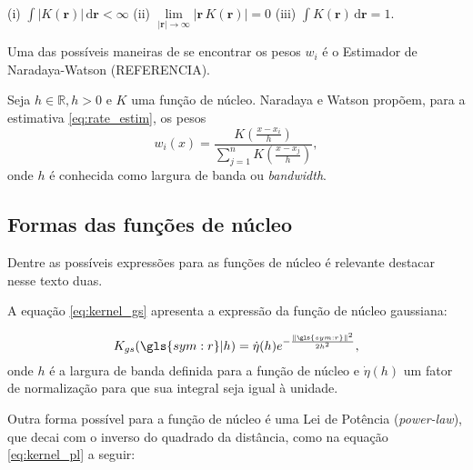 \begin{center}
(i) $\int \lvert K(\boldsymbol{r})\rvert \,\mathrm{d}\boldsymbol{r} < \infty $
\;\;\;\;\;(ii) $\underset{ \lvert\boldsymbol{r} \rvert \to \infty }{\lim} 
				\lvert \boldsymbol{r} \, K(\boldsymbol{r})\rvert =0$ 
\;\;\;\;\;(iii) $\int \! K(\boldsymbol{r})	\,\mathrm{d}\boldsymbol{r} = 1 $.
\end{center}

Uma das possíveis maneiras de se encontrar os pesos $w_i$ é o 
Estimador de Naradaya-Watson (REFERENCIA). 

Seja $h \in \mathbb{R}, h > 0$ e $K$ uma função de núcleo. 
Naradaya e Watson propõem, para a estimativa \ref{eq:rate_estim}, os pesos
\begin{equation}
	\ensuremath{
		w_i(x) = \frac{ K\left( \frac{x - x_i}{h} \right)}
					  {\sum_{j=1}^{n} K\left( \frac{x - x_j}{h} \right) },
	}
\label{eq:rate_wi}
\end{equation}
onde $h$ é conhecida como largura de banda ou \emph{bandwidth}.



\subsection{Formas das funções de núcleo}

Dentre as possíveis expressões para as funções de núcleo é relevante destacar nesse texto duas. 

A equação \ref{eq:kernel_gs} apresenta a expressão da função de núcleo gaussiana:

\begin{equation}
	\ensuremath{
		K_{gs}(\gls{sym:r}\arrowvert h) = \dot{\eta}(h)
			e^{- \frac{\|\gls{sym:r}\|^2}
 				 	  {2 h^2 }},
 	}
\label{eq:kernel_gs}
\end{equation}
onde $h$ é a largura de banda definida para a função de núcleo e $\dot{\eta}(h)$ um fator de normalização
para que sua integral seja igual à unidade.


Outra forma possível para a função de núcleo é uma Lei de Potência (\emph{power-law}), que decai com o 
inverso do quadrado da distância, como na equação
\ref{eq:kernel_pl} a seguir:

